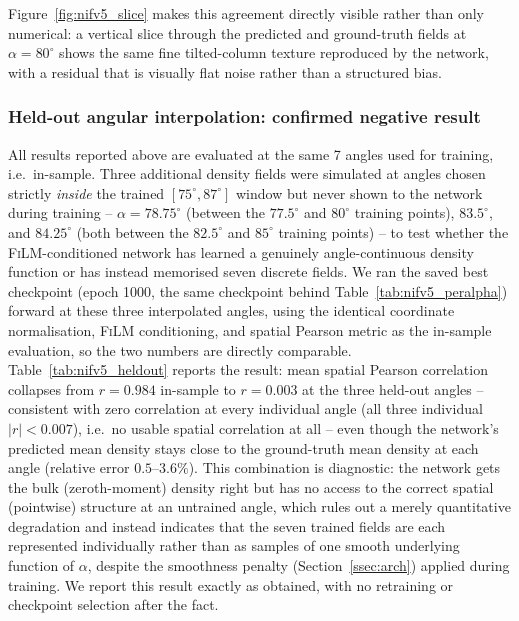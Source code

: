 \documentclass[aip,amsmath,amssymb,reprint]{revtex4-1}
\renewcommand{\ang}{\ensuremath{\alpha}} %
\newcommand{\film}{\textsc{FiLM}}
\begin{document}
Figure~\ref{fig:nifv5_slice} makes this agreement directly visible rather
than only numerical: a vertical slice through the predicted and
ground-truth fields at $\ang=80^{\circ}$ shows the same fine tilted-column
texture reproduced by the network, with a residual that is visually flat
noise rather than a structured bias.

\subsubsection{Held-out angular interpolation: confirmed negative result}
\label{sssec:res1_heldout}

All results reported above are evaluated at the same 7 angles used for
training, i.e.\ in-sample. Three additional density fields were
simulated at angles chosen strictly \emph{inside} the trained
$[75^{\circ},87^{\circ}]$ window but never shown to the network during
training -- $\ang=78.75^{\circ}$ (between the $77.5^{\circ}$ and
$80^{\circ}$ training points), $83.5^{\circ}$, and $84.25^{\circ}$
(both between the $82.5^{\circ}$ and $85^{\circ}$ training points) --
to test whether the \film{}-conditioned network has learned a
genuinely angle-continuous density function or has instead memorised
seven discrete fields. We ran the saved best checkpoint
(epoch 1000, the same checkpoint behind Table~\ref{tab:nifv5_peralpha})
forward at these three interpolated angles, using the identical
coordinate normalisation, \film{} conditioning, and spatial Pearson
metric as the in-sample evaluation, so the two numbers are directly
comparable.
Table~\ref{tab:nifv5_heldout} reports the result: mean spatial Pearson
correlation collapses from $r=0.984$ in-sample to $r=0.003$ at the
three held-out angles -- consistent with zero correlation at every
individual angle (all three individual $|r| < 0.007$), i.e.\ no usable
spatial correlation at all -- even though the network's predicted mean
density stays close to the ground-truth mean density at each angle
(relative error $0.5$--$3.6\%$). This combination is diagnostic: the
network gets the bulk (zeroth-moment) density right but has no access
to the correct spatial (pointwise) structure at an untrained angle,
which rules out a merely quantitative degradation and instead
indicates that the seven trained fields are each represented
individually rather than as samples of one smooth underlying function
of $\ang$, despite the smoothness penalty (Section~\ref{ssec:arch})
applied during training. We report this result exactly as obtained,
with no retraining or checkpoint selection after the fact.
\end{document}
